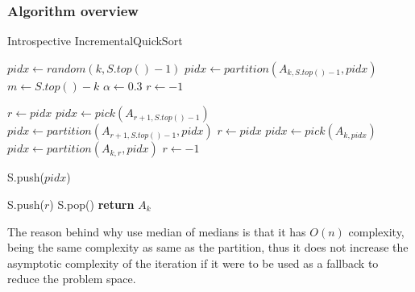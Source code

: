 \subsubsection{Algorithm overview}
\begin{algorithm}
  \begin{algorithmic}[1]
    \caption{Introspective IncrementalQuickSort}\label{ALG:IIQS}
      \State $pidx \gets random(k,S.top()-1)$
      \State $pidx \gets partition(A_{k,S.top()-1}, pidx)$
      \State $m \gets S.top() - k$
      \State $\alpha \gets 0.3$
      \State $r \gets -1$

        \State $r \gets pidx$
        \State $pidx \gets pick(A_{r+1,S.top()-1})$
        \State $pidx \gets partition(A_{r+1,S.top()-1},pidx)$
        \State $r \gets pidx$
        \State $pidx \gets pick(A_{k,pidx})$
        \State $pidx \gets partition(A_{k,r}, pidx)$
        \State $r \gets -1$
      \EndIf

      \State S.push($pidx$)

        \State S.push($r$)
      \EndIf  
    \EndWhile
    \State S.pop()
    \State \textbf{return} $A_{k}$\label{IIQS_main_cycle}
    \EndProcedure
  \end{algorithmic}
\end{algorithm}

The reason behind why use median of medians is that it has $O(n)$ complexity, being the same complexity as same as the partition, thus it does not increase the asymptotic complexity of the iteration if it were to be used as a fallback to reduce the problem space.